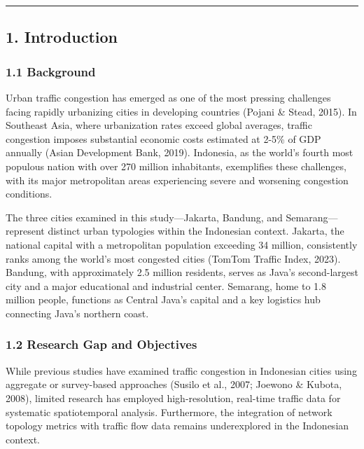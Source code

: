 \documentclass[
  12pt,
]{article}
\begin{document}
\begin{center}\rule{0.5\linewidth}{0.5pt}\end{center}

\subsection{1. Introduction}\label{introduction}

\subsubsection{1.1 Background}\label{background}

Urban traffic congestion has emerged as one of the most pressing challenges facing rapidly urbanizing cities in developing countries (Pojani \& Stead, 2015). In Southeast Asia, where urbanization rates exceed global averages, traffic congestion imposes substantial economic costs estimated at 2-5\% of GDP annually (Asian Development Bank, 2019). Indonesia, as the world's fourth most populous nation with over 270 million inhabitants, exemplifies these challenges, with its major metropolitan areas experiencing severe and worsening congestion conditions.

The three cities examined in this study---Jakarta, Bandung, and Semarang---represent distinct urban typologies within the Indonesian context. Jakarta, the national capital with a metropolitan population exceeding 34 million, consistently ranks among the world's most congested cities (TomTom Traffic Index, 2023). Bandung, with approximately 2.5 million residents, serves as Java's second-largest city and a major educational and industrial center. Semarang, home to 1.8 million people, functions as Central Java's capital and a key logistics hub connecting Java's northern coast.

\subsubsection{1.2 Research Gap and Objectives}\label{research-gap-and-objectives}

While previous studies have examined traffic congestion in Indonesian cities using aggregate or survey-based approaches (Susilo et al., 2007; Joewono \& Kubota, 2008), limited research has employed high-resolution, real-time traffic data for systematic spatiotemporal analysis. Furthermore, the integration of network topology metrics with traffic flow data remains underexplored in the Indonesian context.
\end{document}
